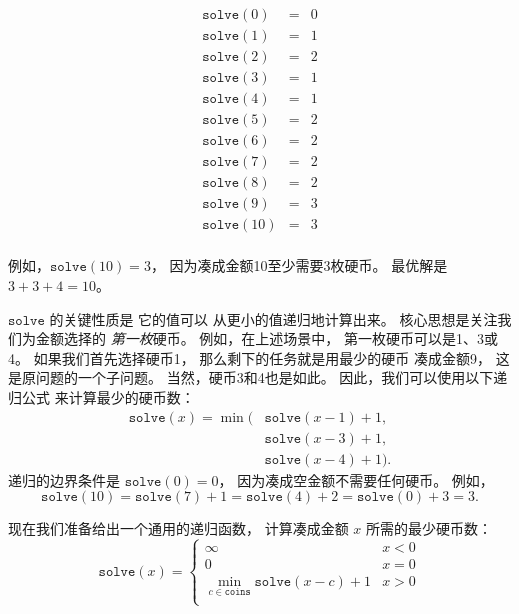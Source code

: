 \[
\begin{array}{lcl}
\texttt{solve}(0) & = & 0 \\
\texttt{solve}(1) & = & 1 \\
\texttt{solve}(2) & = & 2 \\
\texttt{solve}(3) & = & 1 \\
\texttt{solve}(4) & = & 1 \\
\texttt{solve}(5) & = & 2 \\
\texttt{solve}(6) & = & 2 \\
\texttt{solve}(7) & = & 2 \\
\texttt{solve}(8) & = & 2 \\
\texttt{solve}(9) & = & 3 \\
\texttt{solve}(10) & = & 3 \\
\end{array}
\]

例如，$\texttt{solve}(10)=3$，
因为凑成金额10至少需要3枚硬币。
最优解是 $3+3+4=10$。

$\texttt{solve}$ 的关键性质是
它的值可以
从更小的值递归地计算出来。
核心思想是关注我们为金额选择的
\emph{第一枚}硬币。
例如，在上述场景中，
第一枚硬币可以是1、3或4。
如果我们首先选择硬币1，
那么剩下的任务就是用最少的硬币
凑成金额9，
这是原问题的一个子问题。
当然，硬币3和4也是如此。
因此，我们可以使用以下递归公式
来计算最少的硬币数：
\begin{equation*}
\begin{split}
\texttt{solve}(x) = \min( & \texttt{solve}(x-1)+1, \\
                           & \texttt{solve}(x-3)+1, \\
                           & \texttt{solve}(x-4)+1).
\end{split}
\end{equation*}
递归的边界条件是 $\texttt{solve}(0)=0$，
因为凑成空金额不需要任何硬币。
例如，
\[ \texttt{solve}(10) = \texttt{solve}(7)+1 = \texttt{solve}(4)+2 = \texttt{solve}(0)+3 = 3.\]

现在我们准备给出一个通用的递归函数，
计算凑成金额 $x$ 
所需的最少硬币数：
\begin{equation*}
    \texttt{solve}(x) = \begin{cases}
               \infty               & x < 0\\
               0               & x = 0\\
               \min_{c \in \texttt{coins}} \texttt{solve}(x-c)+1 & x > 0 \\
           \end{cases}
\end{equation*}

